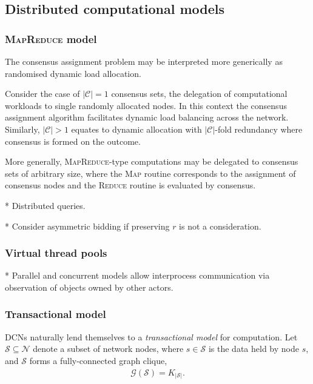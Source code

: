 \subsection{Distributed computational models}

\subsubsection{\textsc{MapReduce} model}

The consensus assignment problem may be interpreted more generically as randomised dynamic load allocation.

Consider the case of $|\mathcal{C}|=1$ consensus sets, the delegation of computational workloads to single randomly allocated nodes. In this context the consensus assignment algorithm facilitates dynamic load balancing across the network. Similarly, \mbox{$|\mathcal{C}|>1$} equates to dynamic allocation with $|\mathcal{C}|$-fold redundancy where consensus is formed on the outcome.

More generally, \textsc{MapReduce}-type \cite{MapReduce} computations may be delegated to consensus sets of arbitrary size, where the \textsc{Map} routine corresponds to the assignment of consensus nodes and the \textsc{Reduce} routine is evaluated by consensus.

* Distributed queries.

* Consider asymmetric bidding if preserving $r$ is not a consideration.

\subsubsection{Virtual thread pools}

* Parallel and concurrent models allow interprocess communication via observation of objects owned by other actors.

\subsubsection{Transactional model}

DCNs naturally lend themselves to a \emph{transactional model} for computation. Let \mbox{$\mathcal{S}\subseteq\mathcal{N}$} denote a subset of network nodes, where \mbox{$s\in \mathcal{S}$} is the data held by node $s$, and $\mathcal{S}$ forms a fully-connected graph clique,
\begin{align}
	\mathcal{G}(\mathcal{S}) = K_{|\mathcal{S}|}.
\end{align}

